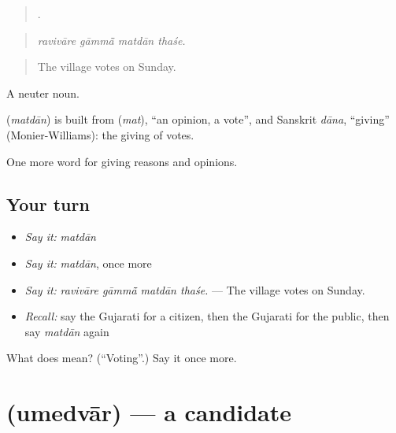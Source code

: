 \begin{quote}
   .
\end{quote}

\begin{quote}
\emph{ravivāre gāmmā̃ matdān thaśe.}
\end{quote}

\begin{quote}
The village votes on Sunday.
\end{quote}

A neuter noun.

\begin{cousinweb}
\textbf{} (\emph{matdān}) is built from \textbf{} (\emph{mat}), \textquotedblleft{}an opinion, a vote\textquotedblright{}, and Sanskrit \emph{dāna}, \textquotedblleft{}giving\textquotedblright{} (Monier-Williams): the giving of votes.
\end{cousinweb}

\begin{grammarlens}[title={What you've built}]
One more word for giving reasons and opinions.
\end{grammarlens}

\subsection*{Your turn}
\begin{itemize}
\raggedright
  \item \emph{Say it:} \emph{matdān}
  \item \emph{Say it:} \emph{matdān}, once more
  \item \emph{Say it:} \emph{ravivāre gāmmā̃ matdān thaśe.} — The village votes on Sunday.
  \item \emph{Recall:} say the Gujarati for a citizen, then the Gujarati for the public, then say \emph{matdān} again
\end{itemize}

\begin{tcolorbox}[breakable,colback=teal!4,colframe=teal!35!black,title={Before you move on}]
What does  mean? (\textquotedblleft{}Voting\textquotedblright{}.) Say it once more.
\end{tcolorbox}
\section[\texorpdfstring{\gu{ઉમેદવાર} (umedvār)}{ઉમેદવાર (umedvār)}]{ (umedvār) — a candidate}

